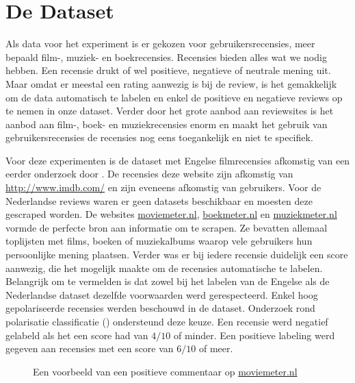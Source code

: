 \section{De Dataset}\label{De Dataset}

Als data voor het experiment is er gekozen voor gebruikersrecensies, meer bepaald film-, muziek- en boekrecensies. Recensies bieden alles wat we nodig hebben. Een recensie drukt of wel positieve, negatieve of neutrale mening uit. Maar omdat er meestal een rating aanwezig is bij de review, is het gemakkelijk om de data automatisch te labelen en enkel de positieve en negatieve reviews op te nemen in onze dataset. Verder door het grote aanbod aan reviewsites is het aanbod aan film-, boek- en muziekrecensies enorm en maakt het gebruik van gebruikersrecensies de recensies nog eens toegankelijk en niet te specifiek. 

Voor deze experimenten is de dataset met Engelse filmrecensies afkomstig van een eerder onderzoek door \cite{maas-EtAl:2011:ACL-HLT2011}. De recensies deze website zijn afkomstig van \url{http://www.imdb.com/} en zijn eveneens afkomstig van gebruikers. Voor de Nederlandse reviews waren er geen datasets beschikbaar en moesten deze gescraped worden. De websites \url{moviemeter.nl}, \url{boekmeter.nl} en \url{muziekmeter.nl} vormde de perfecte bron aan informatie om te scrapen. Ze bevatten allemaal toplijsten met films, boeken of muziekalbums waarop vele gebruikers hun persoonlijke mening plaatsen. Verder was er bij iedere recensie duidelijk een score aanwezig, die het mogelijk maakte om de recensies automatische te labelen. Belangrijk om te vermelden is dat zowel bij het labelen van de Engelse als de Nederlandse dataset dezelfde voorwaarden werd gerespecteerd. Enkel hoog gepolariseerde recensies werden beschouwd in de dataset. Onderzoek rond polarisatie classificatie (\cite{maas-EtAl:2011:ACL-HLT2011}) ondersteund deze keuze. Een recensie werd negatief gelabeld als het een score had van $4/10$ of minder. Een positieve labeling werd gegeven aan recensies met een score van $6/10$ of meer.\\

\begin{figure}[h]%
    \centering
    \caption{Een voorbeeld van een positieve commentaar op \url{moviemeter.nl}}%
\end{figure}
\newline

